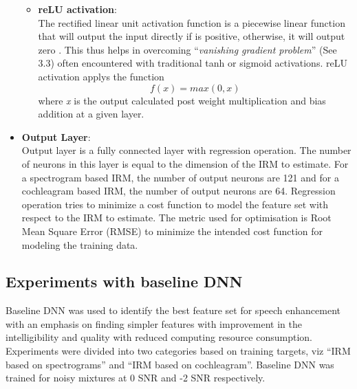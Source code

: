 \begin{itemize}
\begin{itemize}
\begin{enumerate}
\end{enumerate}
\item \textbf{reLU activation}:\\
The rectified linear unit activation function is a piecewise linear function that will output the input directly if is positive, otherwise, it will output zero \cite{wiki:relu}. This thus helps in overcoming \enquote{\textit{vanishing gradient problem}} (See 3.3) often encountered with traditional tanh or sigmoid activations. reLU activation applys the function  $$f(x)=max(0,x)$$ where \textit{x} is the output calculated post weight multiplication and bias addition at a given layer. 
\end{itemize}
\item \textbf{Output Layer}:\\
Output layer is a fully connected layer with regression operation. The number of neurons in this layer is equal to the dimension of the IRM to estimate. For a spectrogram based IRM, the number of output neurons are 121 and for a cochleagram based IRM, the number of output neurons are 64. Regression operation tries to minimize a cost function to model the feature set with respect to the IRM to estimate. The metric used for optimisation is Root Mean Square Error (RMSE) to minimize the intended cost function for modeling the training data.
\end{itemize}

\subsection{Experiments with baseline DNN}
Baseline DNN was used to identify the best feature set for speech enhancement with an emphasis on finding simpler features with improvement in the intelligibility and quality with reduced computing resource consumption. Experiments were divided into two categories based on training targets, viz \enquote{IRM based on spectrograms} and \enquote{IRM based on cochleagram}. Baseline DNN was trained for noisy mixtures at 0 SNR and -2 SNR respectively.\\

